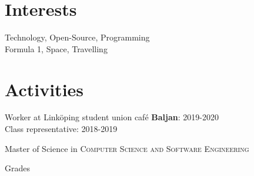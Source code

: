 \documentclass[a4paper,10pt]{article}
\begin{document}
\section{Interests}
Technology, Open-Source, Programming\\
Formula 1, Space, Travelling\\

\section{Activities}
Worker at Linköping student union café \textbf{Baljan}: 2019-2020\\
Class representative: 2018-2019

\newpage
\par{\centering\Large \hypertarget{grds_liu}{Master of Science in \textsc{Computer Science and Software Engineering}}\par}\large{\centering Grades\par}\normalsize
\end{document}
